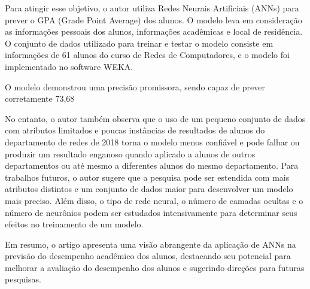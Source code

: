 \documentclass[conference]{IEEEtran}
\begin{document}
Para atingir esse objetivo, o autor utiliza Redes Neurais Artificiais (ANNs) para prever o GPA (Grade Point Average) dos alunos. O modelo leva em consideração as informações pessoais dos alunos, informações acadêmicas e local de residência. O conjunto de dados utilizado para treinar e testar o modelo consiste em informações de 61 alunos do curso de Redes de Computadores, e o modelo foi implementado no software WEKA.

O modelo demonstrou uma precisão promissora, sendo capaz de prever corretamente 73,68%

No entanto, o autor também observa que o uso de um pequeno conjunto de dados com atributos limitados e poucas instâncias de resultados de alunos do departamento de redes de 2018 torna o modelo menos confiável e pode falhar ou produzir um resultado enganoso quando aplicado a alunos de outros departamentos ou até mesmo a diferentes alunos do mesmo departamento. Para trabalhos futuros, o autor sugere que a pesquisa pode ser estendida com mais atributos distintos e um conjunto de dados maior para desenvolver um modelo mais preciso. Além disso, o tipo de rede neural, o número de camadas ocultas e o número de neurônios podem ser estudados intensivamente para determinar seus efeitos no treinamento de um modelo.

Em resumo, o artigo apresenta uma visão abrangente da aplicação de ANNs na previsão do desempenho acadêmico dos alunos, destacando seu potencial para melhorar a avaliação do desempenho dos alunos e sugerindo direções para futuras pesquisas.
\end{document}
